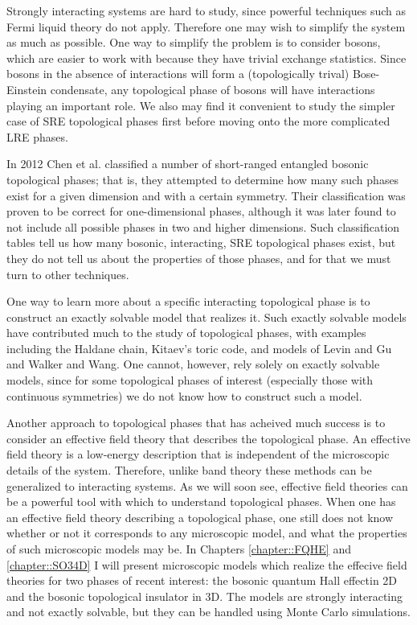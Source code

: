 Strongly interacting systems are hard to study, since powerful techniques such as Fermi liquid theory do not apply. Therefore one may wish to simplify the system as much as possible. 
One way to simplify the problem is to consider bosons, which are easier to work with because they have trivial exchange statistics.
Since bosons in the absence of interactions will form a (topologically trival) Bose-Einstein condensate, any topological phase of bosons will have interactions playing an important role.
We also may find it convenient to study the simpler case of SRE topological phases first before moving onto the more complicated LRE phases.

In 2012 Chen et al.\cite{WenScience,WenPRB} classified a number of short-ranged entangled bosonic topological phases; that is, they attempted to determine how many such phases exist for a given dimension and with a certain symmetry. Their classification was proven to be correct for one-dimensional phases, although it was later found to not include all possible phases in two and higher dimensions\cite{LuVishwanath,KapustinThorngren}. Such classification tables tell us how many bosonic, interacting, SRE topological phases exist, but they do not tell us about the properties of those phases, and for that we must turn to other techniques.

One way to learn more about a specific interacting topological phase is to construct an exactly solvable model that realizes it. Such exactly solvable models have contributed much to the study of topological phases, with examples including the Haldane chain, Kitaev's toric code\cite{KitaevToric}, and models of Levin and Gu\cite{LevinGu2012} and Walker and Wang\cite{WalkerWang,KeyserlingkBurnell2014}. One cannot, however, rely solely on exactly solvable models, since for some topological phases of interest (especially those with continuous symmetries) we do not know how to construct such a model.

Another approach to topological phases that has acheived much success is to consider an effective field theory that describes the topological phase. An effective field theory is a low-energy description that is independent of the microscopic details of the system. Therefore, unlike band theory these methods can be generalized to interacting systems. As we will soon see, effective field theories can be a powerful tool with which to understand topological phases. When one has an effective field theory describing a topological phase, one still does not know whether or not it corresponds to any microscopic model, and what the properties of such microscopic models may be. In Chapters \ref{chapter::FQHE} and \ref{chapter::SO34D} I will present microscopic models which realize the effecive field theories for two phases of recent interest: the bosonic quantum Hall effectin 2D and the bosonic topological insulator in 3D. The models are strongly interacting and not exactly solvable, but they can be handled using Monte Carlo simulations.


